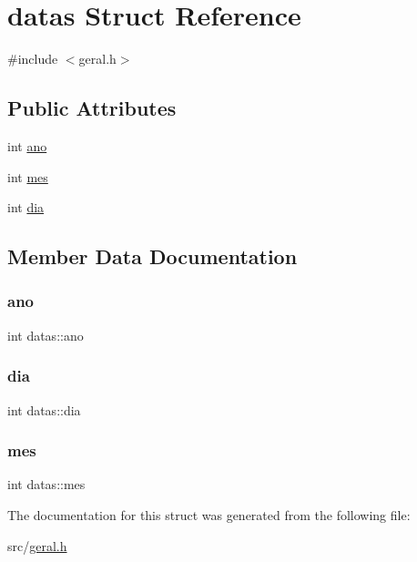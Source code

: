 \hypertarget{structdatas}{}\section{datas Struct Reference}
\label{structdatas}


{\ttfamily \#include $<$geral.\+h$>$}

\subsection*{Public Attributes}
\begin{DoxyCompactItemize}
\item 
int \mbox{\hyperlink{structdatas_abaab91c6f7dd70a95c06d25359d97335}{ano}}
\item 
int \mbox{\hyperlink{structdatas_a6c83c17aba19fc623bf15a05700b4ee2}{mes}}
\item 
int \mbox{\hyperlink{structdatas_a0d3ff873cf5b7be9618af232e4802d00}{dia}}
\end{DoxyCompactItemize}


\subsection{Member Data Documentation}
\mbox{\label{structdatas_abaab91c6f7dd70a95c06d25359d97335}} 
\subsubsection{\texorpdfstring{ano}{ano}}
{\footnotesize\ttfamily int datas\+::ano}

\mbox{\label{structdatas_a0d3ff873cf5b7be9618af232e4802d00}} 
\subsubsection{\texorpdfstring{dia}{dia}}
{\footnotesize\ttfamily int datas\+::dia}

\mbox{\label{structdatas_a6c83c17aba19fc623bf15a05700b4ee2}} 
\subsubsection{\texorpdfstring{mes}{mes}}
{\footnotesize\ttfamily int datas\+::mes}



The documentation for this struct was generated from the following file\+:\begin{DoxyCompactItemize}
\item 
src/\mbox{\hyperlink{geral_8h}{geral.\+h}}\end{DoxyCompactItemize}
